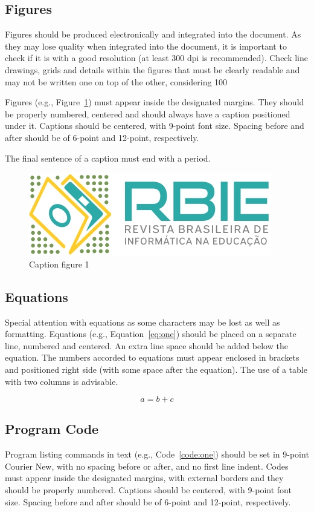 \documentclass[english,brazilian]{RBIEarticle} %
\begin{document}
\subsection{Figures}
Figures should be produced electronically and integrated into the document. As they may lose quality when integrated into the document, it is important to check if it is with a good resolution (at least 300 dpi is recommended). Check line drawings, grids and details within the figures that must be clearly readable and may not be written one on top of the other, considering 100%

Figures (e.g., Figure~\ref{fig:one}) must appear inside the designated margins. They should be properly numbered, centered and should always have a caption positioned under it. Captions should be centered, with 9-point font size. Spacing before and after should be of 6-point and 12-point, respectively.

The final sentence of a caption must end with a period. 

\begin{figure}[h]
	\centerline{\includegraphics[scale=0.25]{newlogo.png}}
	\caption{Caption figure 1}
	\label{fig:one}
\end{figure}


\subsection{Equations}
Special attention with equations as some characters may be lost as well as formatting. Equations (e.g., Equation~\ref{eq:one}) should be placed on a separate line, numbered and centered. An extra line space should be added below the equation. The numbers accorded to equations must appear enclosed in brackets and positioned right side (with some space after the equation).
The use of a table with two columns is advisable.

\begin{equation}
	a = b + c
	\label{eq:one}
\end{equation}


\subsection{Program Code}
Program listing commands in text (e.g., Code~\ref{code:one}) should be set in 9-point Courier New, with no spacing before or after, and no first line indent. Codes must appear inside the designated margins, with external borders and they should be properly numbered. Captions should be centered, with 9-point font size. Spacing before and after should be of 6-point and 12-point, respectively.
\end{document}
